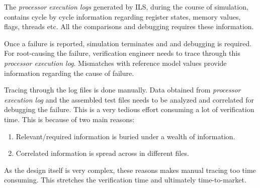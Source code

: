 \label{verif:exelog}

The {\it processor execution logs} generated by ILS, during the course of simulation, contains cycle by cycle information regarding register states, memory values, flags, threads etc. All the comparisons and debugging requires these information.

Once a failure is reported, simulation terminates and and debugging is required. For root-causing the failure, verification engineer needs to trace through this {\it processor execution log}. Mismatches with reference model values provide information regarding the cause of failure.

Tracing through the log files is done manually. Data obtained from {\it processor execution log} and the assembled test files needs to be analyzed and correlated for debugging the failure. This is a very tedious effort consuming a lot of verification time. This is because of two main reasons:

\begin{enumerate}
	\item Relevant/required information is buried under a wealth of information.
	\item Correlated information is spread across in different files.
\end{enumerate}

As the design itself is very complex, these reasons makes manual tracing too time consuming. This stretches the verification time and ultimately time-to-market.   



